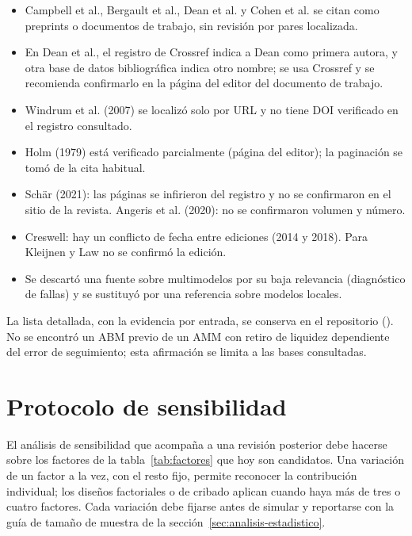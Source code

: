 \begin{itemize}
  \item Campbell et al., Bergault et al., Dean et al. y Cohen et al. se citan como preprints o documentos de trabajo, sin revisión por pares localizada.
  \item En Dean et al., el registro de Crossref indica a Dean como primera autora, y otra base de datos bibliográfica indica otro nombre; se usa Crossref y se recomienda confirmarlo en la página del editor del documento de trabajo.
  \item Windrum et al. (2007) se localizó solo por URL y no tiene DOI verificado en el registro consultado.
  \item Holm (1979) está verificado parcialmente (página del editor); la paginación se tomó de la cita habitual.
  \item Schär (2021): las páginas se infirieron del registro y no se confirmaron en el sitio de la revista. Angeris et al. (2020): no se confirmaron volumen y número.
  \item Creswell: hay un conflicto de fecha entre ediciones (2014 y 2018). Para Kleijnen y Law no se confirmó la edición.
  \item Se descartó una fuente sobre multimodelos por su baja relevancia (diagnóstico de fallas) y se sustituyó por una referencia sobre modelos locales.
\end{itemize}

La lista detallada, con la evidencia por entrada, se conserva en el repositorio (). No se encontró un ABM previo de un AMM con retiro de liquidez dependiente del error de seguimiento; esta afirmación se limita a las bases consultadas.

\section{Protocolo de sensibilidad}
\label{sec:sensibilidad}

El análisis de sensibilidad que acompaña a una revisión posterior debe hacerse sobre los factores de la tabla~\ref{tab:factores} que hoy son candidatos. Una variación de un factor a la vez, con el resto fijo, permite reconocer la contribución individual; los diseños factoriales o de cribado \cite{morris1991factorial,saltelli2010variance} aplican cuando haya más de tres o cuatro factores. Cada variación debe fijarse antes de simular y reportarse con la guía de tamaño de muestra de la sección~\ref{sec:analisis-estadistico}.
